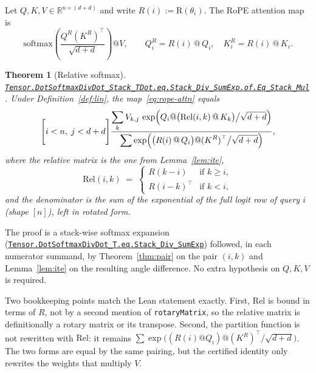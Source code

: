 \documentclass[11pt,a4paper]{article}
\newcommand{\lmod}[1]{\href{http://www.lemma.cn/lean/?module=#1}{\nolinkurl{#1}}}
\newtheorem{theorem}{Theorem}[section]
\newcommand{\R}{\mathbb{R}}
\newcommand{\rot}{\mathrm{R}}
\newcommand{\softmax}{\mathrm{softmax}}
\newcommand{\Rel}{\mathrm{Rel}}
\begin{document}
Let \(Q,K,V\in\R^{n\times(d+d)}\) and write
\(R(i):=\rot(\theta_i)\).
The RoPE attention map is
\begin{equation}
  \label{eq:rope-attn}
  \softmax\!\left(\frac{Q^R (K^R)^\top}{\sqrt{d+d}}\right) @ V,
  \qquad
  Q^R_i = R(i)\,@\,Q_i,\quad
  K^R_i = R(i)\,@\,K_i.
\end{equation}

\begin{theorem}[Relative softmax]
\label{thm:soft}
\lmod{Tensor.DotSoftmaxDivDot_Stack_TDot.eq.Stack_Div_SumExp.of.Eq_Stack_Mul}.
Under Definition~\ref{def:lin}, the map~\eqref{eq:rope-attn} equals
\begin{equation}
  \label{eq:soft}
  \Biggl[
    i < n,\;
    j < d+d
  \Biggr]
  \frac{
    \displaystyle\sum_{k}
      V_{k,j}\,
      \exp\Bigl(
        Q_i @ \bigl(\Rel(i,k)\,@\,K_k\bigr)
        \big/\sqrt{d+d}
      \Bigr)
  }{
    \displaystyle
      \sum\exp\Bigl(
        \bigl(R(i)\,@\,Q_i\bigr)
        @
        (K^R)^\top
        \big/\sqrt{d+d}
      \Bigr)
  },
\end{equation}
where the relative matrix is the one from Lemma~\ref{lem:ite},
\begin{equation}
  \label{eq:rel}
  \Rel(i,k)
  \;=\;
  \begin{cases}
    R(k-i) & \text{if }k\ge i,\\
    R(i-k)^\top & \text{if }k<i,
  \end{cases}
\end{equation}
and the denominator is the sum of the exponential of the full logit row of query \(i\) (shape \([n]\)), left in rotated form.
\end{theorem}

The proof is a stack-wise softmax expansion
(\lmod{Tensor.DotSoftmaxDivDot_T.eq.Stack_Div_SumExp})
followed, in each numerator summand, by Theorem~\ref{thm:pair} on the pair \((i,k)\) and Lemma~\ref{lem:ite} on the resulting angle difference.
No extra hypothesis on \(Q,K,V\) is required.

Two bookkeeping points match the Lean statement exactly.
First, \(\Rel\) is bound in terms of \(R\), not by a second mention of \texttt{rotaryMatrix}, so the relative matrix is definitionally a rotary matrix or its transpose.
Second, the partition function is not rewritten with \(\Rel\): it remains
\(\sum\exp\bigl((R(i)@Q_i)@(K^R)^\top/\sqrt{d+d}\bigr)\).
The two forms are equal by the same pairing, but the certified identity only rewrites the weights that multiply \(V\).
\end{document}
